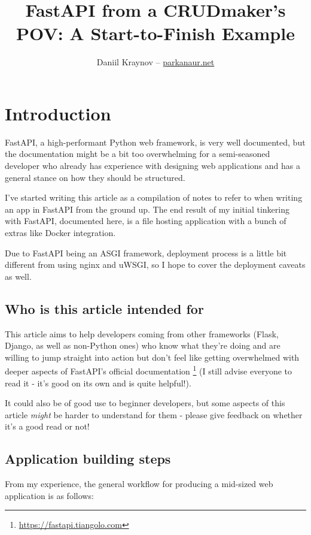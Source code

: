 \documentclass{article}
\title{FastAPI from a CRUDmaker's POV: A Start-to-Finish Example}
\author{Daniil Kraynov -- \href{https://parkanaur.net}{parkanaur.net}}
\newcommand{\flink}[1]{\footnote{\href{#1}{#1}}}
\begin{document}
\maketitle

{\hypersetup{linkcolor=black}
\tableofcontents}

\section{Introduction}

FastAPI, a high-performant Python web framework, is very well documented, but the documentation might be a bit too overwhelming for a semi-seasoned developer who already has experience with designing web applications and has a general stance on how they should be structured.

I've started writing this article as a compilation of notes to refer to when writing an app in FastAPI from the ground up. The end result of my initial tinkering with FastAPI, documented here, is a file hosting application with a bunch of extras like Docker integration.

Due to FastAPI being an ASGI framework, deployment process is a little bit different from using nginx and uWSGI, so I hope to cover the deployment caveats as well.

\subsection{Who is this article intended for}

This article aims to help developers coming from other frameworks (Flask, Django, as well as non-Python ones) who know what they're doing and are willing to jump straight into action but don't feel like getting overwhelmed with deeper aspects of FastAPI's official documentation \flink{https://fastapi.tiangolo.com} (I still advise everyone to read it - it's good on its own and is quite helpful!).

It could also be of good use to beginner developers, but some aspects of this article \textit{might} be harder to understand for them - please give feedback on whether it's a good read or not!

\subsection{Application building steps}

From my experience, the general workflow for producing a mid-sized web application is as follows:
\end{document}
